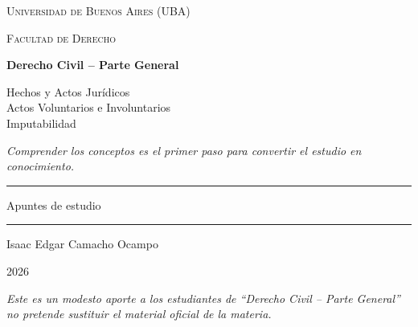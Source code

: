 \documentclass[12pt,oneside]{book}
\newcommand{\universidad}{Universidad de Buenos Aires (UBA)}
\newcommand{\facultad}{Facultad de Derecho}
\newcommand{\materia}{Derecho Civil -- Parte General}
\newcommand{\titulo}{Hechos y Actos Jurídicos \\[0.25cm] Actos Voluntarios e Involuntarios \\[0.25cm] Imputabilidad}
\newcommand{\autor}{Isaac Edgar Camacho Ocampo}
\newcommand{\anio}{2026}
\begin{document}
\begin{titlepage}

\thispagestyle{empty}

\begin{center}

\vspace*{1cm}

{\large \textsc{\universidad}}

\vspace{0.2cm}

{\large \textsc{\facultad}}

\vspace{3cm}

{\Huge \textbf{\materia}}

\vspace{1cm}

{\LARGE \titulo}

\vspace{1.4cm}

\textit{Comprender los conceptos es el primer paso para convertir el estudio en conocimiento.}

\vspace{1.2cm}

\rule{0.70\textwidth}{0.5pt}

\vspace{0.5cm}

{\large Apuntes de estudio}

\vspace{0.5cm}

\rule{0.70\textwidth}{0.5pt}

\vfill

{\large \autor}

\vspace{0.3cm}

{\large \anio}

\end{center}

\vfill

\begin{flushleft}
\textit{Este es un modesto aporte a los estudiantes de ``Derecho Civil -- Parte General'' no pretende sustituir el material oficial de la materia.}
\end{flushleft}

\end{titlepage}

\tableofcontents
\end{document}
